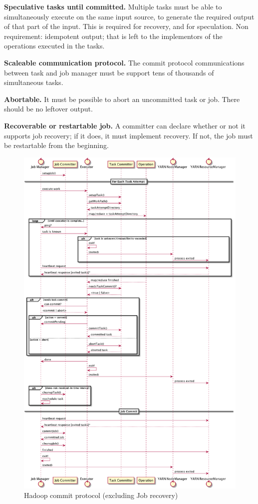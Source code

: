 \documentclass[format=acmsmall, screen=true, nonacm, timestamp, review=false]{acmart}
\begin{document}
\textbf{Speculative tasks until committed.}
Multiple tasks must be able to simultaneously execute on the same input
source, to generate the required output of that part of the input.
This is required for recovery, and for speculation.
Non requirement: idempotent output;
that is left to the implementors of the operations executed in the tasks.

\textbf{Scaleable communication protocol.}
The commit protocol communications between task and job manager
must be support tens of thousands of simultaneous tasks.

\textbf{Abortable.}
It must be possible to abort an uncommitted task or job.
There should be no leftover output.

\textbf{Recoverable or restartable job.}
A committer can declare whether or not it supports job recovery;
if it does, it must implement recovery.
If not, the job must be restartable from the beginning.

\begin{figure}
  \centering
  \includegraphics[width=.8\textwidth]{commit-protocol.png}
  \caption{Hadoop commit protocol (excluding Job recovery)}
  \label{fig:commit-protocol}
\end{figure}
\end{document}
